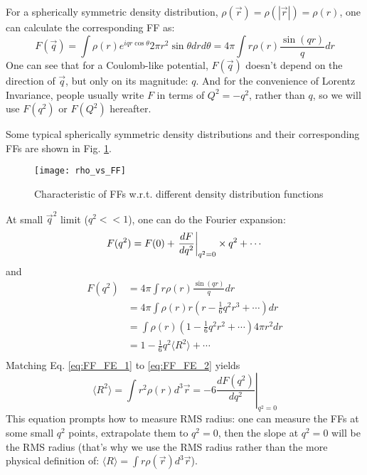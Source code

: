 For a spherically symmetric density distribution, 
$\rho(\vec{r}) = \rho({|\vec{r}|}) = \rho(r)$, 
one can calculate the corresponding FF as:
\begin{equation}
    F(\vec{q}) = \int \rho(r) e^{iqr\cos\theta} 2\pi r^2 \sin\theta dr d\theta
	= 4\pi \int r \rho(r) \frac{\sin{(qr)}}{q} dr
\end{equation}
One can see that for a Coulomb-like potential, $F(\vec{q})$ doesn't depend on
the direction of $\vec{q}$, but only on its magnitude: $q$. And for the convenience 
of Lorentz Invariance, people usually write $F$ in terms of $Q^2 = -q^2$, rather
than $q$, so we will use $F(q^2)$ or $F(Q^2)$ hereafter.

Some typical spherically symmetric density distributions and their 
corresponding FFs are shown in Fig. \ref{fig:FFs}.
\begin{figure}[H]
    \texttt{[image: rho\_vs\_FF]}
    \caption{Characteristic of FFs w.r.t. different density distribution functions}
    \label{fig:FFs}
\end{figure}

At small $\vec{q}^2$ limit ($q^2 << 1$), one can do the Fourier expansion:
\begin{equation}
    F(q^2) = F(0) + \left.\frac{dF}{dq^2}\right|_{q^2=0} \times q^2 + \cdots	\\
    \label{eq:FF_FE_1}
\end{equation}
and
\begin{equation}
    \begin{aligned}
	F(q^2) &= 4\pi \int r \rho(r) \frac{\sin{(qr)}}{q} dr \\
	    &= 4\pi \int \rho(r) r \left( r - \frac{1}{6} q^2r^3 + \cdots \right) dr	\\
	    &= \int \rho(r)  \left( 1 - \frac{1}{6} q^2r^2 + \cdots \right) 4\pi r^2 dr	\\
	    &= 1 - \frac{1}{6}q^2\langle R^2 \rangle + \cdots \\
    \end{aligned}
    \label{eq:FF_FE_2}
\end{equation}
Matching Eq. \ref{eq:FF_FE_1} to \ref{eq:FF_FE_2} yields
\begin{equation}
    \langle R^2 \rangle = \int r^2 \rho(r) d^3\vec{r} = -6 \left. \frac{dF(q^2)}{dq^2} \right|_{q^2 = 0}
\end{equation}
This equation prompts how to measure RMS radius:
one can measure the FFs at some small $q^2$ points, extrapolate them 
to $q^2 = 0$, then the slope at $q^2 = 0$ will be the RMS radius (that's why
we use the RMS radius rather than the more physical definition of: 
$\langle R \rangle = \int  r \rho(\vec{r}) d^3\vec{r}$).

